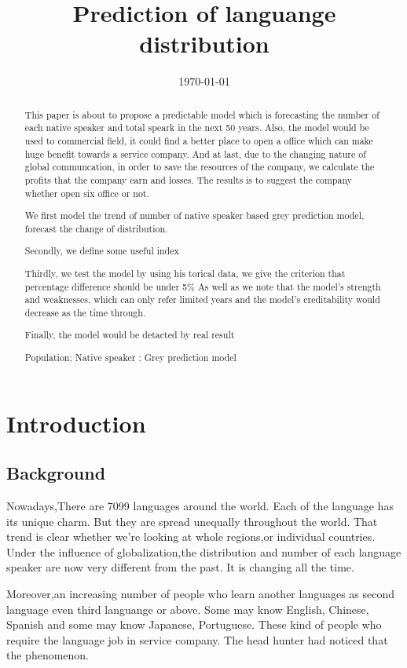 \documentclass{mcmthesis}
\title{Prediction of languange distribution \MCMversion}
\date{\today}
\begin{document}
\begin{abstract}
\qquad This paper is about to propose a predictable model which is forecasting the number of each native speaker and total speark in the next 50 years.
Also, the model would be used to commercial field, it could find a better place to open a office which can make huge benefit towards a service company.
And at last, due to the changing nature of global communcation, in order to save the resources of the company, we calculate the profits that the company earn and losses.
The results is to suggest the company whether open six office or not.


We first model the trend of number of native speaker based grey prediction model, forecast the change of distribution.

Secondly, we define some useful index

Thirdly, we test the model by using his torical data, we give the criterion that percentage difference should be under 5\%
As well as we note that the model's strength and weaknesses, which can only refer limited years and the model's creditability would decrease as the time through.


Finally, the model would be detacted by real result 

\begin{keywords}
Population; Native speaker ; Grey prediction model
\end{keywords}
\end{abstract}
\maketitle
\tableofcontents
\section{Introduction}
\subsection{Background}
\qquad Nowadays,There are 7099 languages around the world. Each of the language has its unique charm.
But they are spread unequally throughout the world. 
That trend is clear whether we’re looking at whole regions,or individual countries.
Under the influence of globalization,the distribution and number of each language speaker are now very different from the past. 
It is changing all the time.
\cite{No-of-languages}


Moreover,an increasing number of people who learn another languages as second language even third languange or above. 
Some may know English, Chinese, Spanish and some may know Japanese, Portuguese. These kind of people who require the language job in service company.
The head hunter had noticed that the phenomenon. 
\end{document}
